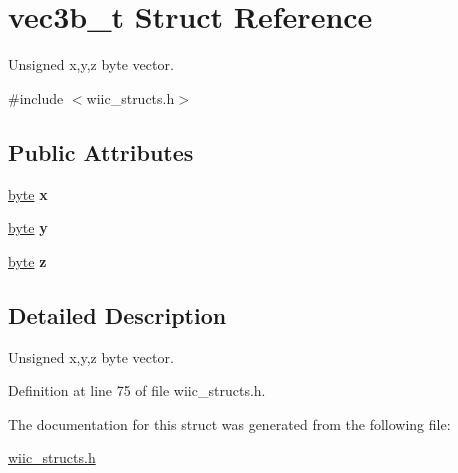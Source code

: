\hypertarget{structvec3b__t}{\section{vec3b\-\_\-t Struct Reference}
\label{structvec3b__t}
}


Unsigned x,y,z byte vector.  




{\ttfamily \#include $<$wiic\-\_\-structs.\-h$>$}

\subsection*{Public Attributes}
\begin{DoxyCompactItemize}
\item 
\hypertarget{structvec3b__t_a5295b93ff596c418bdb337dff3eb7a64}{\hyperlink{wiic__macros_8h_a0c8186d9b9b7880309c27230bbb5e69d}{byte} {\bfseries x}}\label{structvec3b__t_a5295b93ff596c418bdb337dff3eb7a64}

\item 
\hypertarget{structvec3b__t_a0536602fe878b4451f453b640b08c6cc}{\hyperlink{wiic__macros_8h_a0c8186d9b9b7880309c27230bbb5e69d}{byte} {\bfseries y}}\label{structvec3b__t_a0536602fe878b4451f453b640b08c6cc}

\item 
\hypertarget{structvec3b__t_a1d1d231306c68e30c41fb0340e78d603}{\hyperlink{wiic__macros_8h_a0c8186d9b9b7880309c27230bbb5e69d}{byte} {\bfseries z}}\label{structvec3b__t_a1d1d231306c68e30c41fb0340e78d603}

\end{DoxyCompactItemize}


\subsection{Detailed Description}
Unsigned x,y,z byte vector. 

Definition at line 75 of file wiic\-\_\-structs.\-h.



The documentation for this struct was generated from the following file\-:\begin{DoxyCompactItemize}
\item 
\hyperlink{wiic__structs_8h}{wiic\-\_\-structs.\-h}\end{DoxyCompactItemize}
